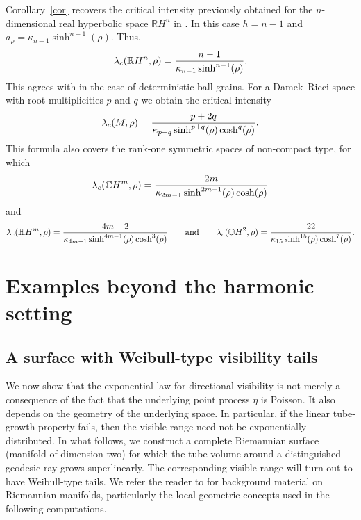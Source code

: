 \documentclass[11pt,a4paper]{article}
\theoremstyle{plain}
\theoremstyle{definition}
\theoremstyle{remark}
\def\CC{\mathbb{C}}
\def\HH{\mathbb{H}}
\def\OO{\mathbb{O}}
\def\RR{\mathbb{R}}
\begin{document}
Corollary~\ref{cor} recovers the critical intensity previously obtained for
the \(n\)-dimensional real hyperbolic space \(\RR H^n\) in
\cite{BuehlerHugThaeleBM}. In this case \(h=n-1\) and $a_\rho=\kappa_{n-1}\sinh^{n-1}(\rho)$. Thus,
\[
\lambda_c(\RR H^n,\rho)
=
{n-1\over \kappa_{n-1}\sinh^{n-1}(\rho)}.
\]
This agrees with \cite[Theorem~6.2 and Remark~6.5]{BuehlerHugThaeleBM} in the
case of deterministic ball grains.
{For a Damek--Ricci space with root multiplicities \(p\) and \(q\) we obtain the critical intensity
\[
\lambda_c(M,\rho)
=
{p+2q\over
	\kappa_{p+q}\sinh^{p+q}(\rho)\cosh^q(\rho)}.
\]
This formula also covers the rank-one symmetric spaces of non-compact type, for which
\[
\lambda_c(\CC H^m,\rho)
=
{2m\over
	\kappa_{2m-1}\sinh^{2m-1}(\rho)\cosh(\rho)}
\]
and
$$
\lambda_c(\HH H^m,\rho) = {4m+2\over
	\kappa_{4m-1}\sinh^{4m-1}(\rho)\cosh^3(\rho)} \qquad\text{and}\qquad \lambda_c(\OO H^2,\rho) = {22\over
	\kappa_{15}\sinh^{15}(\rho)\cosh^7(\rho)}.
$$}



\section{Examples beyond the harmonic setting}\label{sec:Example}

\subsection{A surface with Weibull-type visibility tails}


We now show that the exponential law for directional visibility is not merely a consequence of the fact that the underlying point process \(\eta\) is Poisson. It also depends on the geometry of the underlying
space. In particular, if the linear tube-growth property fails, then the
visible range need not be exponentially distributed. In what follows, we construct a complete Riemannian surface (manifold of dimension two) for which the tube volume around a
distinguished geodesic ray grows superlinearly. The corresponding visible
range will turn out to have Weibull-type tails. We refer the reader to \cite{Lee} for background material on Riemannian manifolds, particularly the local geometric concepts used in the following computations.
\end{document}
